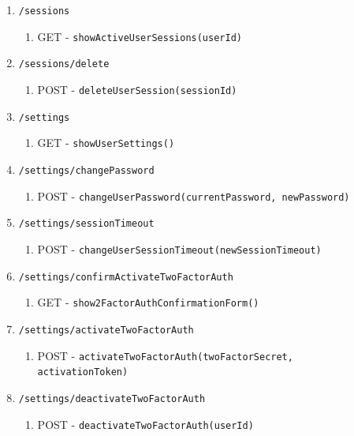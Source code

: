 \documentclass[12pt,DIV14,BCOR10mm,a4paper,parskip=half-,headsepline,headinclude,english,ngerman,bibliography=totocnumbered]{scrreprt}
\begin{document}
\begin{enumerate}
\begin{enumerate}
\begin{enumerate}
      \item \texttt{/sessions}
      \begin{enumerate}
        \item GET - \texttt{showActiveUserSessions(userId)}
      \end{enumerate}
      \item \texttt{/sessions/delete}
      \begin{enumerate}
        \item POST - \texttt{deleteUserSession(sessionId)}
      \end{enumerate}
      \item \texttt{/settings}
      \begin{enumerate}
        \item GET - \texttt{showUserSettings()}
      \end{enumerate}
      \item \texttt{/settings/changePassword}
      \begin{enumerate}
        \item POST - \texttt{changeUserPassword(currentPassword, newPassword)}
      \end{enumerate}
      \item \texttt{/settings/sessionTimeout}
      \begin{enumerate}
        \item POST - \texttt{changeUserSessionTimeout(newSessionTimeout)}
      \end{enumerate}

      \item \texttt{/settings/confirmActivateTwoFactorAuth}
      \begin{enumerate}
        \item GET - \texttt{show2FactorAuthConfirmationForm()}
      \end{enumerate}
      \item \texttt{/settings/activateTwoFactorAuth}
      \begin{enumerate}
        \item POST - \texttt{activateTwoFactorAuth(twoFactorSecret,\\activationToken)}
      \end{enumerate}
      \item \texttt{/settings/deactivateTwoFactorAuth}
      \begin{enumerate}
        \item POST - \texttt{deactivateTwoFactorAuth(userId)}
      \end{enumerate}
    \end{enumerate}


\end{enumerate}
\end{enumerate}
\end{document}
